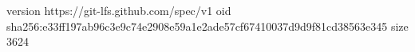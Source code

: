 version https://git-lfs.github.com/spec/v1
oid sha256:e33ff197ab96c3e9c74e2908e59a1e2ade57cf67410037d9d9f81cd38563e345
size 3624
